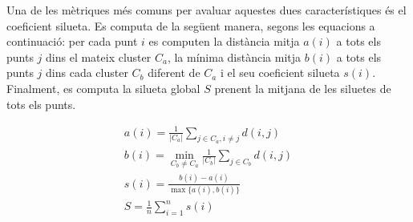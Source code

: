\documentclass[CAT,BIB]{TFUOC}%
\begin{document}
%
%
%


            Una de les mètriques més comuns
            per avaluar aquestes dues característiques
            és el coeficient silueta.
            Es computa de la següent manera,
            segons les equacions a continuació:
            per cada punt $i$ es computen
            la distància mitja $a(i)$ a tots els punts $j$ dins el mateix cluster $C_a$,
            la mínima distància mitja $b(i)$ a tots els punts $j$ dins cada cluster $C_b$ diferent de $C_a$
            i el seu coeficient silueta $s(i)$.
            Finalment, es computa la silueta global $S$
            prenent la mitjana de les siluetes de tots els punts.

            \begin{gather}
                a(i) = \frac{1}{|C_a|}
                \sum_{j \in C_a, i \neq j} d(i,j)
                \\
                b(i) = \min_{C_b \neq C_a}
                \frac{1}{|C_b|}
                \sum_{j \in C_b} d(i,j)
                \\
                s(i) = \frac
                {b(i) - a(i)}
                {\max \{a(i), b(i)\}}
                \\
                \label{eq:sil}
                S = \frac{1}{n}
                \sum_{i=1}^{n} s(i)
            \end{gather}
\end{document}
